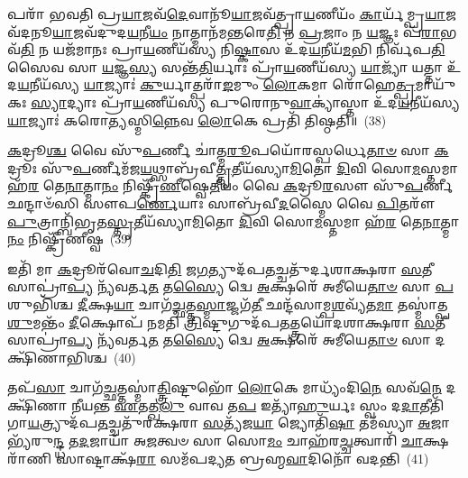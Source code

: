 𑌪𑌰𑌾᳴ 𑌭𑌵𑌤𑌿 𑌪𑍍𑌰\-\ul{𑌯𑌾}\-𑌜𑌵᳴\-\ul{𑌦𑍇}\-𑌵𑌾𑌨𑍂᳴\-\ul{𑌯𑌾}\-𑌜𑌵᳴𑌤𑍍𑌪𑍍𑌰𑌾\-\ul{𑌯}\-𑌣𑍀𑌯𑌂᳴ \ul{𑌕𑌾}\-𑌰𑍍𑌯᳴𑌮𑍍𑌪𑍍𑌰\-\ul{𑌯𑌾}\-𑌜𑌵᳴𑌦𑌨𑍂\-\ul{𑌯𑌾}\-𑌜𑌵᳴𑌦𑍁𑌦\-\ul{𑌯}\-𑌨𑍀\-\ul{𑌯𑌂} 𑌨𑌾𑌤𑍍𑌮𑌾𑌨᳴𑌮\-\ul{𑌨𑍍𑌤}\-𑌰𑍇\-\ul{𑌤𑌿} 𑌨 \ul{𑌪𑍍𑌰}\-𑌜𑌾𑌂 𑌨 \ul{𑌯}\-𑌜𑍍𑌞𑌃 𑌪᳴\-\ul{𑌰𑌾}\-𑌭𑌵᳴\-\ul{𑌤𑌿} 𑌨 𑌯𑌜᳴𑌮𑌾𑌨𑌃 𑌪𑍍𑌰𑌾\-\ul{𑌯}\-𑌣𑍀𑌯᳴𑌸𑍍𑌯 𑌨𑌿\-\ul{𑌷𑍍𑌕𑌾}\-𑌸 𑌉᳴𑌦\-\ul{𑌯}\-𑌨𑍀𑌯᳴\-\ul{𑌮}\-𑌭𑌿 𑌨𑌿𑌰𑍍𑌵᳴𑌪\-\ul{𑌤𑌿} 𑌸𑍈𑌵 𑌸𑌾 \ul{𑌯}\-𑌜𑍍𑌞\-\ul{𑌸𑍍𑌯} 𑌸𑌨𑍍𑌤᳴\-\ul{𑌤𑌿}\-𑌰𑍍𑌯𑌾𑌃 𑌪𑍍𑌰𑌾᳴\-\ul{𑌯}\-𑌣𑍀𑌯᳴𑌸𑍍𑌯 \ul{𑌯𑌾}\-𑌜𑍍𑌯𑌾᳴ 𑌯𑌤𑍍𑌤𑌾 𑌉᳴𑌦\-\ul{𑌯}\-𑌨𑍀𑌯᳴𑌸𑍍𑌯 \ul{𑌯𑌾}\-𑌜𑍍𑌯𑌾𑌃॑ \ul{𑌕𑍁}\-𑌰𑍍𑌯𑌾𑌤𑍍𑌪𑌰𑌾᳴\-\ul{𑌙}\-𑌮𑍁𑌂 \ul{𑌲𑍋}\-𑌕𑌮𑌾 𑌰𑍋᳴𑌹𑍇\-\ul{𑌤𑍍𑌪𑍍𑌰}\-𑌮𑌾𑌯𑍁᳴𑌕𑌃 \ul{𑌸𑍍𑌯𑌾}\-𑌦𑍍𑌯𑌾𑌃 𑌪𑍍𑌰𑌾᳴\-\ul{𑌯}\-𑌣𑍀𑌯᳴𑌸𑍍𑌯 𑌪𑍁𑌰𑍋𑌨𑍁\-\ul{𑌵𑌾}\-𑌕𑍍𑌯𑌾॑𑌸𑍍𑌤𑌾 𑌉᳴𑌦\-\ul{𑌯}\-𑌨𑍀𑌯᳴𑌸𑍍𑌯 \ul{𑌯𑌾}\-𑌜𑍍𑌯𑌾𑌃॑ 𑌕𑌰𑍋\-\ul{𑌤𑍍𑌯}\-𑌸𑍍𑌮𑌿\-\ul{𑌨𑍍𑌨𑍇}\-𑌵 \ul{𑌲𑍋}\-𑌕𑍇 𑌪𑍍𑌰𑌤𑌿᳴ 𑌤𑌿𑌷𑍍𑌠𑌤𑌿॥~(38)

{\anuvakamend[{𑌪𑍍𑌰𑌜𑍍𑌞𑌾॑𑌤𑍍𑌯𑍈 𑌪𑌶𑍍𑌯𑌤𑍍𑌯𑌨𑍂\-\ul{𑌯𑌾}\-𑌜\-\ul{𑌵}\-𑌦𑍍𑌯𑌜᳴\-\ul{𑌮𑌾}\-𑌨𑍋\-𑌽𑌨𑍁᳴ 𑌪𑍁𑌰𑍋𑌨𑍁\-\ul{𑌵𑌾}\-𑌕𑍍𑌯𑌾॑𑌸𑍍𑌤𑌾 \ul{𑌅}\-𑌷𑍍𑌟𑍗 𑌚᳴}]}%

\-\ul{𑌕}\-𑌦𑍍𑌰𑍂\-\ul{𑌶𑍍𑌚} 𑌵𑍈 𑌸𑍁᳴\-\ul{𑌪}\-𑌰𑍍𑌣𑍀 𑌚𑌾॑𑌤𑍍𑌮\-\ul{𑌰𑍂}\-𑌪𑌯𑍋᳴𑌰𑌸𑍍𑌪𑌰𑍍𑌧𑍇\-\ul{𑌤𑌾}\-\-\ul{𑍞} 𑌸𑌾 \ul{𑌕}\-𑌦𑍍𑌰𑍂𑌃 𑌸𑍁᳴\-\ul{𑌪}\-𑌰𑍍𑌣𑍀𑌮᳴𑌜\-\ul{𑌯}\-𑌥𑍍𑌸𑌾𑌬𑍍𑌰᳴𑌵𑍀\-\ul{𑌤𑍍𑌤𑍃}\-𑌤𑍀𑌯᳴𑌸𑍍𑌯𑌾\-\ul{𑌮𑌿}\-𑌤𑍋 \ul{𑌦𑌿}\-𑌵𑌿 𑌸𑍋\-\ul{𑌮}\-𑌸𑍍𑌤𑌮𑌾 𑌹᳴\-\ul{𑌰} 𑌤𑍇\-\ul{𑌨𑌾}\-𑌤𑍍𑌮𑌾\-\ul{𑌨𑌂} 𑌨𑌿𑌷𑍍𑌕𑍍𑌰𑍀᳴\-\ul{𑌣𑍀}\-𑌷𑍍𑌵𑍇\-\ul{𑌤𑍀}\-𑌯𑌂 𑌵𑍈 \ul{𑌕}\-𑌦𑍍𑌰𑍂\-\ul{𑌰}\-𑌸𑍗 𑌸𑍁᳴\-\ul{𑌪}\-𑌰𑍍𑌣𑍀 𑌛𑌨𑍍𑌦𑌾𑍞᳴𑌸𑌿 𑌸𑍗𑌪\-\ul{𑌰𑍍𑌣𑍇}\-𑌯𑌾𑌃 𑌸𑌾𑌬𑍍𑌰᳴𑌵𑍀\-\ul{𑌦}\-𑌸𑍍𑌮𑍈 𑌵𑍈 \ul{𑌪𑌿}\-𑌤𑌰𑍗᳴ \ul{𑌪𑍁}\-𑌤𑍍𑌰𑌾𑌨𑍍𑌬𑌿᳴𑌭𑍃𑌤\-\ul{𑌸𑍍𑌤𑍃}\-𑌤𑍀𑌯᳴𑌸𑍍𑌯𑌾\-\ul{𑌮𑌿}\-𑌤𑍋 \ul{𑌦𑌿}\-𑌵𑌿 𑌸𑍋\-\ul{𑌮}\-𑌸𑍍𑌤𑌮𑌾 𑌹᳴\-\ul{𑌰} 𑌤𑍇\-\ul{𑌨𑌾}\-𑌤𑍍𑌮𑌾\-\ul{𑌨𑌂} 𑌨𑌿𑌷𑍍𑌕𑍍𑌰𑍀᳴𑌣𑍀𑌷𑍍𑌵~(39)

𑌇𑌤𑌿᳴ 𑌮𑌾 \ul{𑌕}\-𑌦𑍍𑌰𑍂𑌰᳴𑌵𑍋\-\ul{𑌚}\-𑌦𑌿\-\ul{𑌤𑌿} 𑌜\-\ul{𑌗}\-𑌤𑍍𑌯𑍁𑌦᳴𑌪\-\ul{𑌤}\-𑌚𑍍𑌚𑌤𑍁᳴𑌰𑍍𑌦𑌶𑌾𑌕𑍍𑌷𑌰𑌾 \ul{𑌸}\-𑌤𑍀 𑌸𑌾𑌪𑍍𑌰𑌾॑\-\ul{𑌪𑍍𑌯} 𑌨𑍍𑌯᳴𑌵𑌰𑍍𑌤\-\ul{𑌤} 𑌤\-\ul{𑌸𑍍𑌯𑍈} 𑌦𑍍𑌵𑍇 \ul{𑌅}\-𑌕𑍍𑌷𑌰𑍇᳴ 𑌅𑌮𑍀𑌯𑍇\-\ul{𑌤𑌾}\-\-\ul{𑍞} 𑌸𑌾 \ul{𑌪}\-𑌶𑍁𑌭𑌿᳴𑌶𑍍𑌚 \ul{𑌦𑍀}\-𑌕𑍍𑌷\-\ul{𑌯𑌾} 𑌚𑌾𑌗᳴\-\ul{𑌚𑍍𑌛}\-𑌤𑍍𑌤\-\ul{𑌸𑍍𑌮𑌾}\-𑌜𑍍𑌜𑌗᳴\-\ul{𑌤𑍀} 𑌛𑌨𑍍𑌦᳴𑌸𑌾𑌮𑍍𑌪\-\ul{𑌶}\-𑌵𑍍𑌯᳴𑌤\-\ul{𑌮𑌾} 𑌤𑌸𑍍𑌮𑌾॑𑌤𑍍𑌪\-\ul{𑌶𑍁}\-𑌮𑌨𑍍𑌤𑌂᳴ \ul{𑌦𑍀}\-𑌕𑍍𑌷𑍋𑌪᳴ 𑌨𑌮𑌤𑌿 \ul{𑌤𑍍𑌰𑌿}\-𑌷𑍍𑌟𑍁𑌗𑍁𑌦᳴𑌪\-\ul{𑌤}\-𑌤𑍍𑌤𑍍𑌰𑌯𑍋᳴𑌦𑌶𑌾𑌕𑍍𑌷𑌰𑌾 \ul{𑌸}\-𑌤𑍀 𑌸𑌾𑌪𑍍𑌰𑌾॑\-\ul{𑌪𑍍𑌯} 𑌨𑍍𑌯᳴𑌵𑌰𑍍𑌤\-\ul{𑌤} 𑌤\-\ul{𑌸𑍍𑌯𑍈} 𑌦𑍍𑌵𑍇 \ul{𑌅}\-𑌕𑍍𑌷𑌰𑍇᳴ 𑌅𑌮𑍀𑌯𑍇\-\ul{𑌤𑌾}\-\-\ul{𑍞} 𑌸𑌾 𑌦𑌕𑍍𑌷𑌿᳴𑌣𑌾𑌭𑌿𑌶𑍍𑌚~(40)

𑌤𑌪᳴\-\ul{𑌸𑌾} 𑌚𑌾𑌗᳴\-\ul{𑌚𑍍𑌛}\-𑌤𑍍𑌤𑌸𑍍𑌮𑌾॑\-\ul{𑌤𑍍𑌤𑍍𑌰𑌿}\-𑌷𑍍𑌟𑍁𑌭𑍋᳴ \ul{𑌲𑍋}\-𑌕𑍇 𑌮𑌾𑌧𑍍𑌯𑌂᳴𑌦𑌿\-\ul{𑌨𑍇} 𑌸𑌵᳴\-\ul{𑌨𑍇} 𑌦𑌕𑍍𑌷𑌿᳴𑌣𑌾 𑌨𑍀𑌯𑌨𑍍𑌤 \ul{𑌏}\-𑌤𑌤𑍍𑌖\-\ul{𑌲𑍁} 𑌵𑌾𑌵 𑌤\-\ul{𑌪} 𑌇𑌤𑍍𑌯𑌾᳴\-\ul{𑌹𑍁}\-𑌰𑍍𑌯𑌃 𑌸𑍍𑌵𑌂 𑌦\-\ul{𑌦𑌾}\-𑌤𑍀𑌤𑌿᳴ 𑌗𑌾\-\ul{𑌯}\-𑌤𑍍𑌰𑍍𑌯𑍁𑌦᳴𑌪\-\ul{𑌤}\-𑌚𑍍𑌚𑌤𑍁᳴𑌰𑌕𑍍𑌷𑌰𑌾 \ul{𑌸}\-𑌤𑍍𑌯᳴𑌜\-\ul{𑌯𑌾} 𑌜𑍍𑌯𑍋𑌤𑌿᳴\-\ul{𑌷𑌾} 𑌤𑌮᳴𑌸𑍍𑌯𑌾 \ul{𑌅}\-𑌜𑌾𑌭𑍍𑌯᳴𑌰𑍁\-\ul{𑌨𑍍𑌦𑍍𑌧} 𑌤\-\ul{𑌦}\-𑌜𑌾𑌯𑌾᳴ 𑌅\-\ul{𑌜}\-𑌤𑍍𑌵𑍞 𑌸𑌾 𑌸𑍋\-\ul{𑌮𑌂} 𑌚𑌾𑌹᳴𑌰\-\ul{𑌚𑍍𑌚}\-𑌤𑍍𑌵𑌾𑌰𑌿᳴ \ul{𑌚𑌾}\-𑌕𑍍𑌷𑌰𑌾᳴𑌣𑌿 𑌸𑌾𑌷𑍍𑌟𑌾𑌕𑍍𑌷᳴\-\ul{𑌰𑌾} 𑌸𑌮᳴𑌪𑌦𑍍𑌯𑌤 𑌬𑍍𑌰𑌹𑍍𑌮\-\ul{𑌵𑌾}\-𑌦𑌿𑌨𑍋᳴ 𑌵𑌦𑌨𑍍𑌤𑌿~(41)

